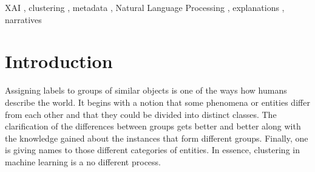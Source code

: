\documentclass[
 twocolumn,
 hf,
]{ceurart}
\begin{document}
\begin{keywords}
  XAI \sep
  clustering \sep
  metadata \sep
  Natural Language Processing \sep
  explanations \sep
  narratives
\end{keywords}

\maketitle

\section{Introduction}\label{sec:introduction}
Assigning labels to groups of similar objects is one of the ways how humans describe the world.
It begins with a notion that some phenomena or entities differ from each other and that they could be divided into distinct classes.
The clarification of the differences between groups gets better and better along with the knowledge gained about the instances that form different groups.
Finally, one is giving names to those different categories of entities. %
In essence, clustering in machine learning is a no different process.
\end{document}
